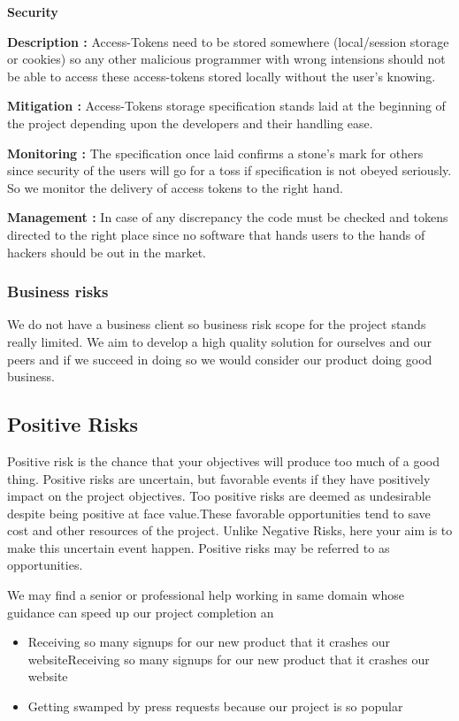 \documentclass[12pt]{article}
\begin{document}
\begin{enumerate}
\textbf{Security}

\bigskip
\textbf{Description :}
Access-Tokens need to be stored somewhere (local/session storage or cookies) so any other malicious programmer with wrong intensions should not be able to access these access-tokens stored locally without the user's knowing.

\bigskip
\textbf{Mitigation :}
Access-Tokens storage specification stands laid at the beginning of the project depending upon the developers and their handling ease.

\bigskip
\textbf{Monitoring :}
The specification once laid confirms a stone's mark for others since security of the users will go for a toss if specification is not obeyed seriously. So we monitor the delivery of access tokens to the right hand.

\bigskip
\textbf{Management :}
In case of  any discrepancy the code must be checked and tokens directed to the right place since no software that hands users to the hands of hackers should be out in the market.
\subsubsection{Business risks}
We do not have a business client so business risk scope for the project stands really limited. We aim to develop a high quality solution for ourselves and our peers and if we succeed in doing so  we would consider our product doing good business. 
\end{enumerate}

\subsection{Positive Risks}
Positive risk is the chance that your objectives will produce too much of a good thing. Positive risks are uncertain, but favorable events if they have positively impact on the project objectives.
 Too positive risks are deemed as undesirable despite being positive at face value.These favorable opportunities tend to save cost and other resources of the project. Unlike Negative Risks, here your aim is to make this uncertain event happen.
 Positive risks may be referred to as opportunities.
 
 

We may find a senior or professional help working in same domain whose guidance can speed up our project completion an
 
\begin{itemize}
    \item Receiving so many signups for our new product that it crashes our websiteReceiving so many signups for our new product that it crashes our website
    \item Getting swamped by press requests because our project is so popular
\end{itemize}
\end{document}
